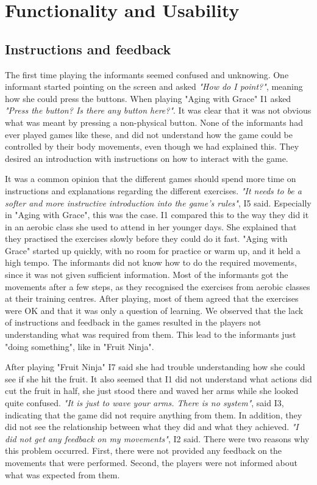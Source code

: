 \section{Functionality and Usability}
\subsection{Instructions and feedback}
The first time playing the informants seemed confused and unknowing. One informant started pointing on the screen and asked \emph{"How do I point?"}, meaning how she could press the buttons. When playing "Aging with Grace" I1 asked \emph{"Press the button? Is there any button here?"}. It was clear that it was not obvious what was meant by pressing a non-physical button. None of the informants had ever played games like these, and did not understand how the game could be controlled by their body movements, even though we had explained this. They desired an introduction with instructions on how to interact with the game.

It was a common opinion that the different games should spend more time on instructions and explanations regarding the different exercises. \emph{"It needs to be a softer and more instructive introduction into the game's rules"}, I5 said. Especially in "Aging with Grace", this was the case. I1 compared this to the way they did it in an aerobic class she used to attend in her younger days. She explained that they practised the exercises slowly before they could do it fast. "Aging with Grace" started up quickly, with no room for practice or warm up, and it held a high tempo. The informants did not know how to do the required movements, since it was not given sufficient information. Most of the informants got the movements after a few steps, as they recognised the exercises from aerobic classes at their training centres. After playing, most of them agreed that the exercises were OK and that it was only a question of learning. We observed that the lack of instructions and feedback in the games resulted in the players not understanding what was required from them. This lead to the informants just "doing something", like in "Fruit Ninja". 

After playing "Fruit Ninja" I7 said she had trouble understanding how she could see if she hit the fruit. It also seemed that I1 did not understand what actions did cut the fruit in half, she just stood there and waved her arms while she looked quite confused. \emph{"It is just to wave your arms. There is no system"}, said I3, indicating that the game did not require anything from them. In addition, they did not see the relationship between what they did and what they achieved. \emph{"I did not get any feedback on my movements"}, I2 said. There were two reasons why this problem occurred. First, there were not provided any feedback on the movements that were performed. Second, the players were not informed about what was expected from them.  

